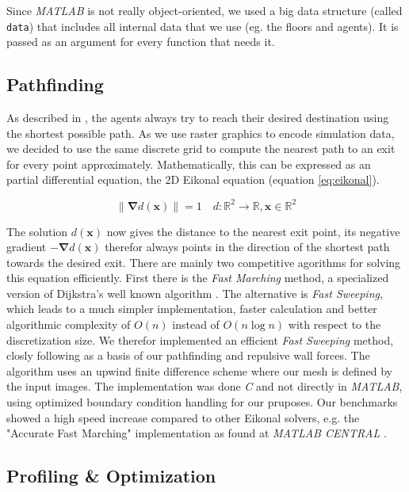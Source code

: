 \documentclass[11pt]{article}
\begin{document}
Since \textit{MATLAB} is not really object-oriented, we used a big data
structure (called \verb+data+) that includes all internal data that we use (eg.
the floors and agents).  It is passed as an argument for every function that
needs it.

\subsection{Pathfinding}
As described in \cite{SFMPD}, the agents always try to reach their desired destination
using the shortest possible path. As we use raster graphics to encode simulation data,
we decided to use the same discrete grid to compute the nearest path to an exit for every point approximately.
Mathematically, this can be expressed as an partial differential equation, the 2D Eikonal equation (equation \ref{eq:eikonal}).

\begin{equation} \label{eq:eikonal}
\|\mathbf{\nabla} d(\mathbf{x})\|=1 \quad d:\!\mathbb{R}^{2}\to\mathbb{R},\mathbf{x}\in\mathbb{R}^{2}
\end{equation}

The solution $d(\mathbf{x})$ now gives the distance to the nearest exit point, its
negative gradient $-\mathbf{\nabla}d(\mathbf{x})$ therefor always points in the 
direction of the shortest path towards the desired exit. There are mainly two
competitive agorithms for solving this equation efficiently. First there is the
\textit{Fast Marching} method, a specialized version of Dijkstra's well known 
algorithm \cite{dijkstra59a}. The alternative is \textit{Fast Sweeping}, which 
leads to a much simpler implementation, faster calculation and better algorithmic
complexity of $O(n)$ instead of $O(n\log n)$ with respect to the discretization size.
We therefor implemented an efficient \textit{Fast Sweeping} method, closly following
\cite{Zhao04afast} as a basis of our pathfinding and repulsive wall forces. The 
algorithm uses an upwind finite difference scheme where our mesh is defined by 
the input images. The implementation was done \textit{C} and not directly in
\textit{MATLAB}, using optimized boundary condition handling for our pruposes.
Our benchmarks showed a high speed increase compared to other Eikonal solvers,
e.g. the "Accurate Fast Marching" implementation as found at \textit{MATLAB CENTRAL}
\cite{fastmarching}.


\subsection{Profiling \& Optimization}
\end{document}
